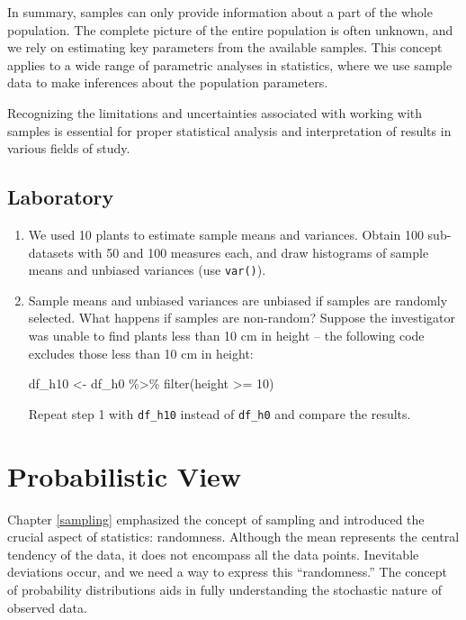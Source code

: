 \documentclass[
]{book}
\newenvironment{Shaded}{\begin{snugshade}}{\end{snugshade}}
\newcommand{\DecValTok}[1]{\textcolor[rgb]{0.00,0.00,0.81}{#1}}
\newcommand{\FunctionTok}[1]{\textcolor[rgb]{0.00,0.00,0.00}{#1}}
\newcommand{\NormalTok}[1]{#1}
\newcommand{\OtherTok}[1]{\textcolor[rgb]{0.56,0.35,0.01}{#1}}
\newcommand{\SpecialCharTok}[1]{\textcolor[rgb]{0.00,0.00,0.00}{#1}}
\begin{document}
In summary, samples can only provide information about a part of the whole population. The complete picture of the entire population is often unknown, and we rely on estimating key parameters from the available samples. This concept applies to a wide range of parametric analyses in statistics, where we use sample data to make inferences about the population parameters.

Recognizing the limitations and uncertainties associated with working with samples is essential for proper statistical analysis and interpretation of results in various fields of study.

\hypertarget{laboratory-1}{%
\section{Laboratory}\label{laboratory-1}}

\begin{enumerate}
\def\labelenumi{\arabic{enumi}.}
\item
  We used 10 plants to estimate sample means and variances. Obtain 100 sub-datasets with 50 and 100 measures each, and draw histograms of sample means and unbiased variances (use \texttt{var()}).
\item
  Sample means and unbiased variances are unbiased if samples are randomly selected. What happens if samples are non-random? Suppose the investigator was unable to find plants less than 10 cm in height -- the following code excludes those less than 10 cm in height:

\begin{Shaded}
\begin{Highlighting}[]
\NormalTok{df\_h10 }\OtherTok{\textless{}{-}}\NormalTok{ df\_h0 }\SpecialCharTok{\%\textgreater{}\%} 
  \FunctionTok{filter}\NormalTok{(height }\SpecialCharTok{\textgreater{}=} \DecValTok{10}\NormalTok{)}
\end{Highlighting}
\end{Shaded}

  Repeat step 1 with \texttt{df\_h10} instead of \texttt{df\_h0} and compare the results.
\end{enumerate}

\hypertarget{probabilistic-view}{%
\chapter{Probabilistic View}\label{probabilistic-view}}

Chapter \ref{sampling} emphasized the concept of sampling and introduced the crucial aspect of statistics: randomness. Although the mean represents the central tendency of the data, it does not encompass all the data points. Inevitable deviations occur, and we need a way to express this ``randomness.'' The concept of probability distributions aids in fully understanding the stochastic nature of observed data.
\end{document}

